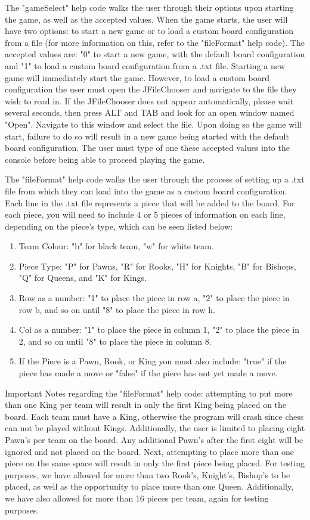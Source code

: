 \documentclass[conference]{IEEEtran}
\begin{document}
The "gameSelect" help code walks the user through their options upon starting the game, as well as the accepted values. When the game starts, the user will have two options: to start a new game or to load a custom board configuration from a file (for more information on this, refer to the "fileFormat" help code). The accepted values are: "0" to start a new game, with the default board configuration and "1" to load a custom board configuration from a .txt file. Starting a new game will immediately start the game. However, to load a custom board configuration the user must open the JFileChooser and navigate to the file they wish to read in. If the JFileChooser does not appear automatically, please wait several seconds, then press ALT and TAB and look for an open window named "Open". Navigate to this window and select the file. Upon doing so the game will start, failure to do so will result in a new game being started with the default board configuration. The user must type of one these accepted values into the console before being able to proceed playing the game.

The "fileFormat" help code walks the user through the process of setting up a .txt file from which they can load into the game as a custom board configuration. Each line in the .txt file represents a piece that will be added to the board. For each piece, you will need to include 4 or 5 pieces of information on each line, depending on the piece's type, which can be seen listed below:

\begin{enumerate}
	\item Team Colour: "b" for black team, "w" for white team.
	\item Piece Type: "P" for Pawns, "R" for Rooks, "H" for Knights, "B" for Bishops, "Q" for Queens, and "K" for Kings.
	\item Row as a number: "1" to place the piece in row a, "2" to place the piece in row b, and so on until "8" to place the piece in row h.
	\item Col as a number: "1" to place the piece in column 1, "2" to place the piece in 2, and so on until "8" to place the piece in column 8.
	\item If the Piece is a Pawn, Rook, or King you must also include: "true" if the piece has made a move or "false" if the piece has not yet made a move.
\end{enumerate}	

Important Notes regarding the "fileFormat" help code: attempting to put more than one King per team will result in only the first King being placed on the board. Each team must have a King, otherwise the program will crash since chess can not be played without Kings. Additionally, the user is limited to placing eight Pawn's per team on the board. Any additional Pawn's after the first eight will be ignored and not placed on the board. Next, attempting to place more than one piece on the same space will result in only the first piece being placed. For testing purposes, we have allowed for more than two Rook's, Knight's, Bishop's to be placed, as well as the opportunity to place more than one Queen. Additionally, we have also allowed for more than 16 pieces per team, again for testing purposes.\\
\end{document}
